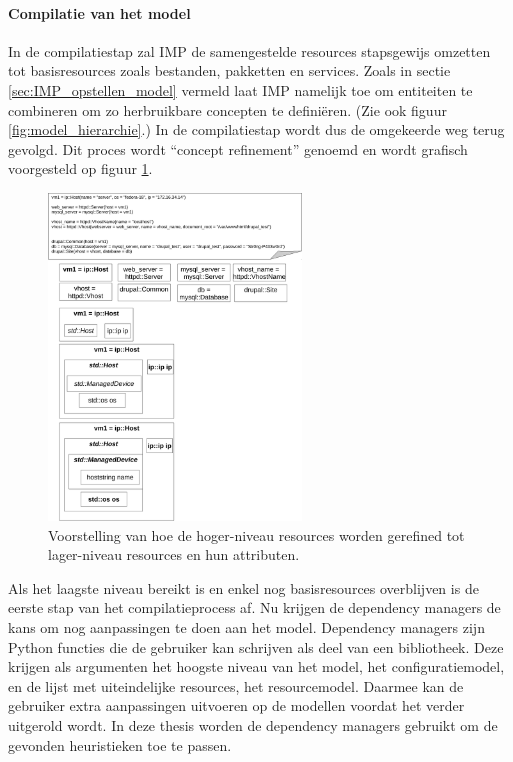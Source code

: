 \paragraph{Compilatie van het model}
In de compilatiestap zal IMP de samengestelde resources stapsgewijs omzetten tot basisresources zoals bestanden, pakketten en services.
Zoals in sectie \ref{sec:IMP_opstellen_model} vermeld laat IMP namelijk toe om entiteiten te combineren om zo herbruikbare concepten te defini\"eren. (Zie ook figuur \ref{fig:model_hierarchie}.)
In de compilatiestap wordt dus de omgekeerde weg terug gevolgd.
Dit proces wordt ``concept refinement'' genoemd en wordt grafisch voorgesteld op figuur \ref{fig:concept_refinement}.

\begin{figure}[h]
    \begin{center}
    \includegraphics[width=0.6\textwidth]{images/concept_refinement.pdf}
    \caption{Voorstelling van hoe de hoger-niveau resources worden gerefined tot lager-niveau resources en hun attributen.}
    \label{fig:concept_refinement}
    \end{center}
\end{figure}

Als het laagste niveau bereikt is en enkel nog basisresources overblijven is de eerste stap van het compilatieprocess af.
Nu krijgen de dependency managers de kans om nog aanpassingen te doen aan het model.
Dependency managers zijn Python functies die de gebruiker kan schrijven als deel van een bibliotheek.
Deze krijgen als argumenten het hoogste niveau van het model, het configuratiemodel, en de lijst met uiteindelijke resources, het resourcemodel.
Daarmee kan de gebruiker extra aanpassingen uitvoeren op de modellen voordat het verder uitgerold wordt.
In deze thesis worden de dependency managers gebruikt om de gevonden heuristieken toe te passen.

